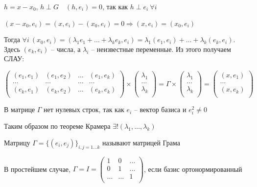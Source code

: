 \documentclass[12pt]{article}
\begin{document}
    $h = x - x_0$, $h \perp G \quad (h, e_i) = 0$, так как $h \perp e_i \ \forall i$

    $(x - x_0, e_i) = (x, e_i) - (x_0, e_i) = 0 \Longrightarrow (x, e_i) = (x_0, e_i)$

    Тогда $\forall i \ (x_0, e_i) = (\lambda_1 e_1 + \dots + \lambda_k e_k, e_i) = \lambda_1 (e_1, e_i) + \dots + \lambda_k (e_k, e_i)$. 
    Здесь $(e_k, e_i)$ -- числа, а $\lambda_i$ -- неизвестные переменные. Из этого получаем СЛАУ:

    $\begin{pmatrix}
    (e_1, e_1) & (e_1, e_2) & \ldots & (e_1, e_k)\\
    \ldots & \ldots & \ldots & \ldots\\
    (e_k, e_1) & (e_k, e_2) & \ldots & (e_k, e_k)\\
    \end{pmatrix} \times 
    \begin{pmatrix}
    \lambda_1\\
    \ldots\\
    \lambda_k \\
    \end{pmatrix} = \Gamma \times \begin{pmatrix}
    \lambda_1\\
    \ldots\\
    \lambda_k \\
    \end{pmatrix} = \begin{pmatrix}
    (x,e_1)\\
    \ldots\\
    (x,e_k) \\
    \end{pmatrix}$

    \Nota В матрице $\Gamma$ нет нулевых строк, так как $e_i$ -- вектор базиса и $e_i^2 \neq 0$

    Таким образом по теореме Крамера $\exists! (\lambda_1, \dots, \lambda_k)$

    \hypertarget{grammatrix}{}

    \Def Матрицу $\Gamma = \{(e_i, e_j)\}_{i, j = 1\dots k}$ называют матрицей Грама

    \smallvspace

    В простейшем случае, $\Gamma = I = \begin{pmatrix}
    1 & 0 & \ldots\\
    0 & 1 & \ldots\\
    \ldots & \ldots & 1\\
    \end{pmatrix}$, если базис ортонормированный
\end{document}

